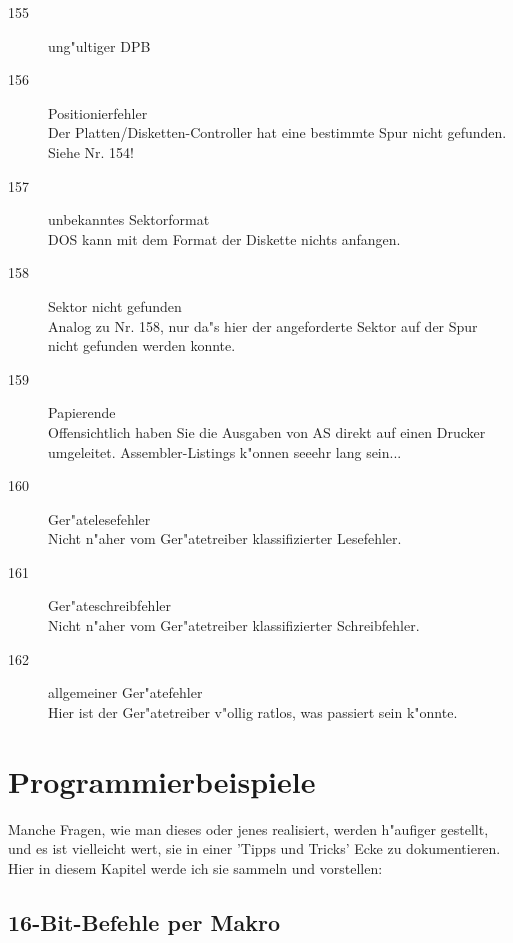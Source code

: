 \documentclass[12pt,a4paper,twoside]{report}
\newcommand{\asname}{AS}
\begin{document}
\begin{description}
\item[155]{ung"ultiger DPB}

\item[156]{Positionierfehler\\
           Der Platten/Disketten-Controller hat eine bestimmte Spur nicht
           gefunden.  Siehe Nr. 154!}

\item[157]{unbekanntes Sektorformat\\
           DOS kann mit dem Format der Diskette nichts anfangen.}

\item[158]{Sektor nicht gefunden\\
           Analog zu Nr. 158, nur da"s hier der angeforderte Sektor auf
           der Spur nicht gefunden werden konnte.}

\item[159]{Papierende\\
           Offensichtlich haben Sie die Ausgaben von \asname{} direkt auf einen
           Drucker umgeleitet.  Assembler-Listings k"onnen seeehr lang
           sein...}

\item[160]{Ger"atelesefehler\\
           Nicht n"aher vom Ger"atetreiber klassifizierter Lesefehler.}

\item[161]{Ger"ateschreibfehler\\
           Nicht n"aher vom Ger"atetreiber klassifizierter Schreibfehler.}

\item[162]{allgemeiner Ger"atefehler\\
           Hier ist der Ger"atetreiber v"ollig ratlos, was passiert
           sein k"onnte.}
\end{description}


\cleardoublepage
\chapter{Programmierbeispiele}

Manche Fragen, wie man dieses oder jenes realisiert, werden h"aufiger gestellt,
und es ist vielleicht wert, sie in einer 'Tipps und Tricks' Ecke zu
dokumentieren.  Hier in diesem Kapitel werde ich sie sammeln und vorstellen:

\section{16-Bit-Befehle per Makro}
\end{document}
